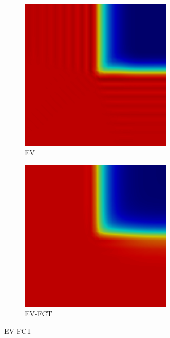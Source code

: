 \documentclass{beamer} \useoutertheme{infolines}
\begin{document}
\begin{frame}
\begin{figure}[h]
\begin{subfigure}{0.3\textwidth}
      \includegraphics[width=0.8\textwidth]{./figures/skew_EV.png}
      \caption{EV}
   \end{subfigure}
   \begin{subfigure}{0.3\textwidth}
      \includegraphics[width=0.8\textwidth]{./figures/skew_EVFCT.png}
      \caption{EV-FCT}
   \end{subfigure}
\end{figure}

\end{frame}
\end{document}
